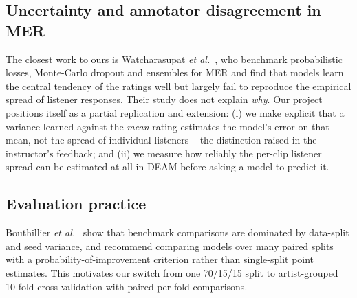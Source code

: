 \subsection{Uncertainty and annotator disagreement in MER}
The closest work to ours is Watcharasupat \emph{et al.}~\cite{watcharasupat2025},
who benchmark probabilistic losses, Monte-Carlo dropout and ensembles for MER
and find that models learn the central tendency of the ratings well but
largely fail to reproduce the empirical spread of listener responses. Their
study does not explain \emph{why}. Our project positions itself as a partial
replication and extension: (i) we make explicit that a variance learned against
the \emph{mean} rating estimates the model's error on that mean, not the spread
of individual listeners -- the distinction raised in the instructor's feedback;
and (ii) we measure how reliably the per-clip listener spread can be estimated
at all in DEAM before asking a model to predict it.

\subsection{Evaluation practice}
Bouthillier \emph{et al.}~\cite{bouthillier2021} show that benchmark
comparisons are dominated by data-split and seed variance, and recommend
comparing models over many paired splits with a probability-of-improvement
criterion rather than single-split point estimates. This motivates our
switch from one 70/15/15 split to artist-grouped 10-fold cross-validation with
paired per-fold comparisons.
